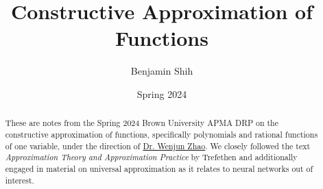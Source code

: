 \documentclass{article}
\title{Constructive Approximation of Functions}
\author{Benjamin Shih}
\date{Spring 2024}
\begin{document}
\begin{titlepage}
\thispagestyle{empty}
\maketitle

\begin{abstract}
These are notes from the Spring 2024 Brown University APMA DRP on the constructive approximation of functions, specifically polynomials and rational functions of one variable, under the direction of \href{https://wenjunzhaowo.github.io}{Dr. Wenjun Zhao}. We closely followed the text \emph{Approximation Theory and Approximation Practice} by Trefethen \cite{atap} and additionally engaged in material on universal approximation as it relates to neural networks out of interest.
\end{abstract}

\tableofcontents
\end{titlepage}





\newpage


\end{document}
